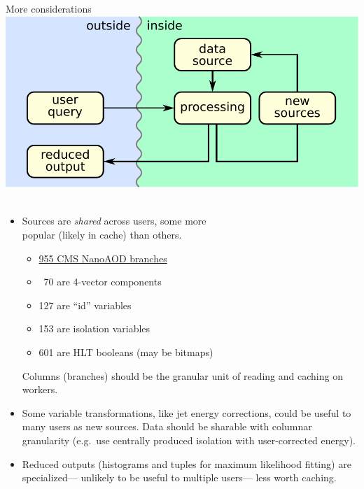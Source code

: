 \documentclass[aspectratio=169]{beamer}
\begin{document}
\begin{frame}{More considerations}
\vspace{0.25 cm}
\hfill \mbox{\includegraphics[height=3 cm]{basic-block-diagram.pdf} \hspace{-0.75 cm}}

\vspace{-3 cm}
\begin{itemize}\setlength{\itemsep}{0.5 cm}
\item<1-> Sources are {\it shared} across users, some more \\ popular (likely in cache) than others.

\vspace{0.1 cm}
\begin{itemize}
\item \underline{955 CMS NanoAOD branches}
\item \textcolor{white}{0}70 are 4-vector components
\item 127 are ``id'' variables
\item 153 are isolation variables
\item 601 are HLT booleans (may be bitmaps)
\end{itemize}

\vspace{0.1 cm}
\hspace{-0.5 cm}Columns (branches) should be the granular unit of reading and caching on workers.

\item<2-> Some variable transformations, like jet energy corrections, could be useful to many users as new sources. Data should be sharable with columnar granularity (e.g.\ use centrally produced isolation with user-corrected energy).

\item<3-> Reduced outputs (histograms and tuples for maximum likelihood fitting) are specialized--- unlikely to be useful to multiple users--- less worth caching.
\end{itemize}
\end{frame}
\end{document}
